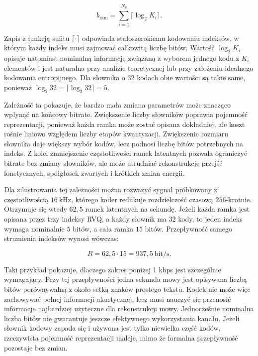 \begin{equation}
    b_{\mathrm{ram}} = \sum_{i=1}^{N_q} \lceil \log_2 K_i \rceil.
\end{equation}

Zapis z funkcją sufitu \(\lceil \cdot \rceil\) odpowiada stałoszerokiemu kodowaniu indeksów, w którym każdy indeks musi zajmować całkowitą liczbę bitów. Wartość \(\log_2 K_i\) opisuje natomiast nominalną informację związaną z wyborem jednego kodu z \(K_i\) elementów i jest naturalna przy analizie teoretycznej lub przy założeniu idealnego kodowania entropijnego. Dla słownika o \(32\) kodach obie wartości są takie same, ponieważ \(\log_2 32 = \lceil \log_2 32 \rceil = 5\).

Zależność ta pokazuje, że bardzo mała zmiana parametrów może znacząco wpłynąć na końcowy bitrate. Zwiększenie liczby słowników poprawia pojemność reprezentacji, ponieważ każda ramka może zostać opisana dokładniej, ale koszt rośnie liniowo względem liczby etapów kwantyzacji. Zwiększenie rozmiaru słownika daje większy wybór kodów, lecz podnosi liczbę bitów potrzebnych na indeks. Z kolei zmniejszenie częstotliwości ramek latentnych pozwala ograniczyć bitrate bez zmiany słowników, ale może utrudniać rekonstrukcję przejść fonetycznych, spółgłosek zwartych i krótkich zmian energii.

Dla zilustrowania tej zależności można rozważyć sygnał próbkowany z częstotliwością \(16\ \mathrm{kHz}\), którego koder redukuje rozdzielczość czasową \(256\)-krotnie. Otrzymuje się wtedy \(62{,}5\) ramek latentnych na sekundę. Jeżeli każda ramka jest opisana przez trzy indeksy RVQ, a każdy słownik ma \(32\) kody, to jeden indeks wymaga nominalnie \(5\) bitów, a cała ramka \(15\) bitów. Przepływność samego strumienia indeksów wynosi wówczas:

\begin{equation}
    R = 62{,}5 \cdot 15 = 937{,}5\ \mathrm{bit/s}.
\end{equation}

Taki przykład pokazuje, dlaczego zakres poniżej 1 kbps jest szczególnie wymagający. Przy tej przepływności jedna sekunda mowy jest opisywana liczbą bitów porównywalną z około setką znaków prostego tekstu. Kodek nie może więc zachowywać pełnej informacji akustycznej, lecz musi nauczyć się przenosić informacje najbardziej użyteczne dla rekonstrukcji mowy. Jednocześnie nominalna liczba bitów nie gwarantuje jeszcze efektywnego wykorzystania kanału. Jeżeli słownik kodowy zapada się i używana jest tylko niewielka część kodów, rzeczywista pojemność reprezentacji maleje, mimo że formalna przepływność pozostaje bez zmian.

